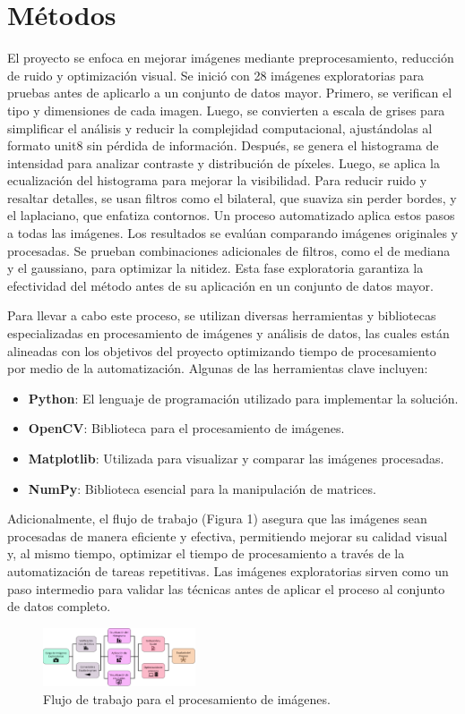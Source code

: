 \section{Métodos}

El proyecto se enfoca en mejorar imágenes mediante preprocesamiento, reducción de ruido y optimización visual. Se inició con 28 imágenes exploratorias para pruebas antes de aplicarlo a un conjunto de datos mayor.  Primero, se verifican el tipo y dimensiones de cada imagen. Luego, se convierten a escala de grises para simplificar el análisis y reducir la complejidad computacional, ajustándolas al formato unit8 sin pérdida de información. Después, se genera el histograma de intensidad para analizar contraste y distribución de píxeles. Luego, se aplica la ecualización del histograma para mejorar la visibilidad. Para reducir ruido y resaltar detalles, se usan filtros como el bilateral, que suaviza sin perder bordes, y el laplaciano, que enfatiza contornos. Un proceso automatizado aplica estos pasos a todas las imágenes.
Los resultados se evalúan comparando imágenes originales y procesadas. Se prueban combinaciones adicionales de filtros, como el de mediana y el gaussiano, para optimizar la nitidez. Esta fase exploratoria garantiza la efectividad del método antes de su aplicación en un conjunto de datos mayor.

Para llevar a cabo este proceso, se utilizan diversas herramientas y bibliotecas especializadas en procesamiento de imágenes y análisis de datos, las cuales están alineadas con los objetivos del proyecto optimizando tiempo de procesamiento por medio de la automatización. Algunas de las herramientas clave incluyen:
\begin{itemize}
    \item \textbf{Python}: El lenguaje de programación utilizado para implementar la solución.
    \item \textbf{OpenCV}: Biblioteca para el procesamiento de imágenes.
    \item \textbf{Matplotlib}: Utilizada para visualizar y comparar las imágenes procesadas.
    \item \textbf{NumPy}: Biblioteca esencial para la manipulación de matrices.
\end{itemize}

Adicionalmente, el flujo de trabajo (Figura 1) asegura que las imágenes sean procesadas de manera eficiente y efectiva, permitiendo mejorar su calidad visual y, al mismo tiempo, optimizar el tiempo de procesamiento a través de la automatización de tareas repetitivas. Las imágenes exploratorias sirven como un paso intermedio para validar las técnicas antes de aplicar el proceso al conjunto de datos completo.

\begin{figure}
    \centering
    \includegraphics[width=0.4\textwidth]{figures/flujo.png}
    \caption{Flujo de trabajo para el procesamiento de imágenes.}
    \label{fig:flujo_trabajo}
\end{figure}